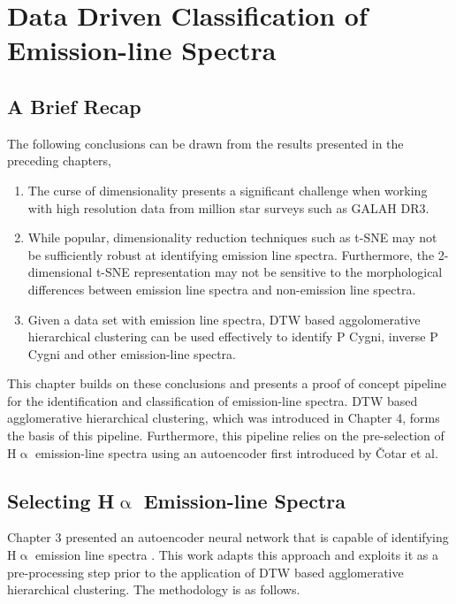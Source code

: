 \chapter{Data Driven Classification of Emission-line Spectra}

\section{A Brief Recap}

The following conclusions can be drawn from the results presented in the preceding chapters,

\begin{enumerate}
    \item The curse of dimensionality presents a significant challenge when working with high resolution data from million star surveys such as GALAH DR3. 
    \item While popular,  dimensionality reduction techniques such as t-SNE may not be sufficiently robust at identifying emission line spectra. Furthermore, the 2-dimensional t-SNE representation may not be sensitive to the morphological differences between emission line spectra and non-emission line spectra.
    \item Given a data set with emission line spectra, DTW based aggolomerative hierarchical clustering can be used effectively to identify P Cygni, inverse P Cygni and other emission-line spectra.
\end{enumerate}

This chapter builds on these conclusions and presents a proof of concept pipeline for the identification and classification of emission-line spectra. DTW based agglomerative hierarchical clustering, which  was introduced in Chapter 4, forms the basis of this pipeline. Furthermore, this pipeline relies on the pre-selection of H$\upalpha$ emission-line spectra using an autoencoder first introduced by Čotar et al.

\section{Selecting H$\upalpha$ Emission-line Spectra}

Chapter 3 presented an autoencoder neural network that is capable of identifying H$\upalpha$ emission line spectra \cite{vcotar2021galah}. This work adapts this approach and exploits it as a pre-processing step prior to the application of DTW based agglomerative hierarchical clustering. The methodology is as follows.

